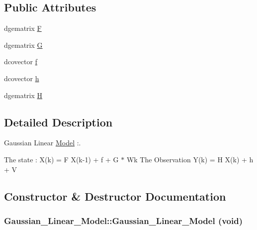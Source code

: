 \subsection*{Public Attributes}
\begin{CompactItemize}
\item 
dgematrix \hyperlink{class_gaussian___linear___model_b0b82054668f84d9144f14023adbe43a}{F}
\item 
dgematrix \hyperlink{class_gaussian___linear___model_4d198f5e8f711cefb5de857b0cf28e6c}{G}
\item 
dcovector \hyperlink{class_gaussian___linear___model_397ff0f1b4258b548fe87b27af41fd64}{f}
\item 
dcovector \hyperlink{class_gaussian___linear___model_aa055db1eaa26e4c9387060a477be7a4}{h}
\item 
dgematrix \hyperlink{class_gaussian___linear___model_fe52ab90d715e5a58c7d64edfc846647}{H}
\end{CompactItemize}


\subsection{Detailed Description}
Gaussian Linear \hyperlink{class_model}{Model} :. 

The state : X(k) = F X(k-1) + f + G $\ast$ Wk The Observation Y(k) = H X(k) + h + V 

\subsection{Constructor \& Destructor Documentation}
\hypertarget{class_gaussian___linear___model_495bfe0a795c2590a8476aff79613fa0}{
\subsubsection[{Gaussian\_\-Linear\_\-Model}]{\setlength{\rightskip}{0pt plus 5cm}Gaussian\_\-Linear\_\-Model::Gaussian\_\-Linear\_\-Model (void)}}
\label{class_gaussian___linear___model_495bfe0a795c2590a8476aff79613fa0}




